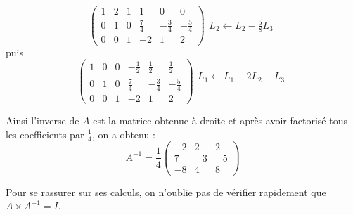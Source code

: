 \documentclass[class=report,crop=false]{standalone}
\begin{document}
$$
\left(\begin{array}{ccc|ccc}
1 & 2 & 1 & 1 & 0 & 0\\
0 & 1 & 0 & \frac{7}{4} & -\frac{3}{4} & -\frac{5}{4}\\
0 & 0 & 1 & -2 & 1 & 2
\end{array}\right)
\begin{array}{l} ~ \\  {\scriptstyle L_2 \leftarrow L_2-\frac{5}{8} L_3} \\ ~ \end{array}
$$
puis
$$
\left(\begin{array}{ccc|ccc}
1 & 0 & 0 & -\frac{1}{2} & \frac{1}{2} & \frac{1}{2}\\
0 & 1 & 0 &\frac{7}{4} & -\frac{3}{4} & -\frac{5}{4}\\
0 & 0 & 1 & -2 & 1 & 2
\end{array}\right)
\begin{array}{l}  {\scriptstyle L_1 \leftarrow L_1-2L_2-L_3} \\ ~ \\ ~ \end{array}
$$

Ainsi l'inverse de $A$ est la matrice obtenue à droite et après avoir factorisé
tous les coefficients par $\frac14$, on a obtenu :
$$
A^{-1} = \frac{1}{4}
\begin{pmatrix}
-2 & 2 & 2\\
7 & -3 & -5\\
-8 & 4 & 8
\end{pmatrix}
$$

Pour se rassurer sur ses calculs,
on n'oublie pas de vérifier rapidement que $A \times A^{-1} = I$.

\end{document}
